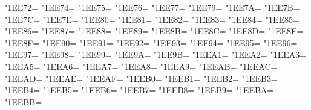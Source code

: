 \XeTeXcharclass"1EE72=\KclassArabU
\XeTeXcharclass"1EE74=\KclassArabU
\XeTeXcharclass"1EE75=\KclassArabU
\XeTeXcharclass"1EE76=\KclassArabU
\XeTeXcharclass"1EE77=\KclassArabU
\XeTeXcharclass"1EE79=\KclassArabU
\XeTeXcharclass"1EE7A=\KclassArabU
\XeTeXcharclass"1EE7B=\KclassArabU
\XeTeXcharclass"1EE7C=\KclassArabU
\XeTeXcharclass"1EE7E=\KclassArabU
\XeTeXcharclass"1EE80=\KclassArabU
\XeTeXcharclass"1EE81=\KclassArabU
\XeTeXcharclass"1EE82=\KclassArabU
\XeTeXcharclass"1EE83=\KclassArabU
\XeTeXcharclass"1EE84=\KclassArabU
\XeTeXcharclass"1EE85=\KclassArabU
\XeTeXcharclass"1EE86=\KclassArabU
\XeTeXcharclass"1EE87=\KclassArabU
\XeTeXcharclass"1EE88=\KclassArabU
\XeTeXcharclass"1EE89=\KclassArabU
\XeTeXcharclass"1EE8B=\KclassArabU
\XeTeXcharclass"1EE8C=\KclassArabU
\XeTeXcharclass"1EE8D=\KclassArabU
\XeTeXcharclass"1EE8E=\KclassArabU
\XeTeXcharclass"1EE8F=\KclassArabU
\XeTeXcharclass"1EE90=\KclassArabU
\XeTeXcharclass"1EE91=\KclassArabU
\XeTeXcharclass"1EE92=\KclassArabU
\XeTeXcharclass"1EE93=\KclassArabU
\XeTeXcharclass"1EE94=\KclassArabU
\XeTeXcharclass"1EE95=\KclassArabU
\XeTeXcharclass"1EE96=\KclassArabU
\XeTeXcharclass"1EE97=\KclassArabU
\XeTeXcharclass"1EE98=\KclassArabU
\XeTeXcharclass"1EE99=\KclassArabU
\XeTeXcharclass"1EE9A=\KclassArabU
\XeTeXcharclass"1EE9B=\KclassArabU
\XeTeXcharclass"1EEA1=\KclassArabU
\XeTeXcharclass"1EEA2=\KclassArabU
\XeTeXcharclass"1EEA3=\KclassArabU
\XeTeXcharclass"1EEA5=\KclassArabU
\XeTeXcharclass"1EEA6=\KclassArabU
\XeTeXcharclass"1EEA7=\KclassArabU
\XeTeXcharclass"1EEA8=\KclassArabU
\XeTeXcharclass"1EEA9=\KclassArabU
\XeTeXcharclass"1EEAB=\KclassArabU
\XeTeXcharclass"1EEAC=\KclassArabU
\XeTeXcharclass"1EEAD=\KclassArabU
\XeTeXcharclass"1EEAE=\KclassArabU
\XeTeXcharclass"1EEAF=\KclassArabU
\XeTeXcharclass"1EEB0=\KclassArabU
\XeTeXcharclass"1EEB1=\KclassArabU
\XeTeXcharclass"1EEB2=\KclassArabU
\XeTeXcharclass"1EEB3=\KclassArabU
\XeTeXcharclass"1EEB4=\KclassArabU
\XeTeXcharclass"1EEB5=\KclassArabU
\XeTeXcharclass"1EEB6=\KclassArabU
\XeTeXcharclass"1EEB7=\KclassArabU
\XeTeXcharclass"1EEB8=\KclassArabU
\XeTeXcharclass"1EEB9=\KclassArabU
\XeTeXcharclass"1EEBA=\KclassArabU
\XeTeXcharclass"1EEBB=\KclassArabU

